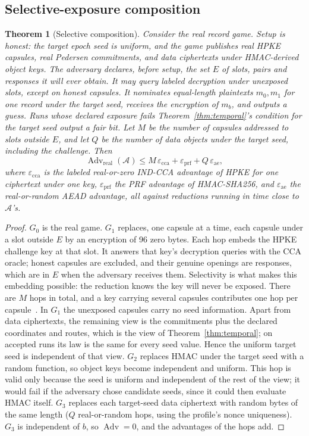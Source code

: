 \documentclass[pdflatex,sn-mathphys-num]{sn-jnl}
\theoremstyle{plain}
\newtheorem{theorem}{Theorem}
\theoremstyle{definition}
\newcommand{\Adv}{\operatorname{Adv}}
\begin{document}
\subsection{Selective-exposure composition}
\begin{theorem}[Selective composition]\label{thm:composition}
Consider the real record game. Setup is honest: the target epoch seed is uniform, and the game publishes real HPKE capsules, real Pedersen commitments, and data ciphertexts under HMAC-derived object keys. The adversary declares, before setup, the set $E$ of slots, pairs and responses it will ever obtain. It may query labeled decryption under unexposed slots, except on honest capsules. It nominates equal-length plaintexts $m_0,m_1$ for one record under the target seed, receives the encryption of $m_b$, and outputs a guess. Runs whose declared exposure fails Theorem~\ref{thm:temporal}'s condition for the target seed output a fair bit. Let $M$ be the number of capsules addressed to slots outside $E$, and let $Q$ be the number of data objects under the target seed, including the challenge. Then
\[
 \Adv_{\mathrm{real}}(\mathcal A)\le M\,\varepsilon_{\mathrm{cca}}+\varepsilon_{\mathrm{prf}}+Q\,\varepsilon_{\mathrm{ae}},
\]
where $\varepsilon_{\mathrm{cca}}$ is the labeled real-or-zero IND-CCA advantage of HPKE for one ciphertext under one key, $\varepsilon_{\mathrm{prf}}$ the PRF advantage of HMAC-SHA256, and $\varepsilon_{\mathrm{ae}}$ the real-or-random AEAD advantage, all against reductions running in time close to $\mathcal A$'s.
\end{theorem}
\begin{proof}
$G_0$ is the real game. $G_1$ replaces, one capsule at a time, each capsule under a slot outside $E$ by an encryption of 96 zero bytes. Each hop embeds the HPKE challenge key at that slot. It answers that key's decryption queries with the CCA oracle; honest capsules are excluded, and their genuine openings are responses, which are in $E$ when the adversary receives them. Selectivity is what makes this embedding possible: the reduction knows the key will never be exposed. There are $M$ hops in total, and a key carrying several capsules contributes one hop per capsule~\cite{bellare2000}. In $G_1$ the unexposed capsules carry no seed information. Apart from data ciphertexts, the remaining view is the commitments plus the declared coordinates and routes, which is the view of Theorem~\ref{thm:temporal}; on accepted runs its law is the same for every seed value. Hence the uniform target seed is independent of that view. $G_2$ replaces HMAC under the target seed with a random function, so object keys become independent and uniform. This hop is valid only because the seed is uniform and independent of the rest of the view; it would fail if the adversary chose candidate seeds, since it could then evaluate HMAC itself. $G_3$ replaces each target-seed data ciphertext with random bytes of the same length ($Q$ real-or-random hops, using the profile's nonce uniqueness). $G_3$ is independent of $b$, so $\Adv=0$, and the advantages of the hops add.
\end{proof}
\end{document}
